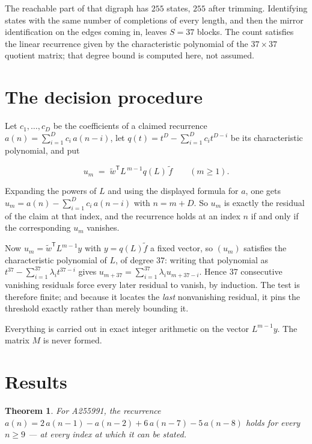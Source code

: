 \documentclass[11pt]{article}
\newtheorem{theorem}{Theorem}
\theoremstyle{definition}
\begin{document}
The reachable part of that digraph has $255$ states, $255$ after trimming. Identifying states with the same number of completions of every length, and then the mirror identification on the edges coming in, leaves $S = 37$ blocks. The count satisfies the linear recurrence given by the characteristic polynomial of the $37\times37$ quotient matrix; that degree bound is computed here, not assumed.

\section{The decision procedure}

Let $c_1,\dots,c_D$ be the coefficients of a claimed recurrence $a(n) = \sum_{i=1}^{D} c_i\,a(n-i)$, let $q(t) = t^{D} - \sum_{i=1}^{D} c_i t^{D-i}$ be its characteristic polynomial, and put

\[u_m \;=\; \tilde w^{\mathsf T} L^{\,m-1} q(L)\,\tilde f \qquad (m \ge 1).\]

Expanding the powers of $L$ and using the displayed formula for $a$, one gets $u_m = a(n) - \sum_{i=1}^{D} c_i\,a(n-i)$ with $n = m + D$. So $u_m$ is exactly the residual of the claim at that index, and the recurrence holds at an index $n$ if and only if the corresponding $u_m$ vanishes.

Now $u_m = \tilde w^{\mathsf T} L^{m-1} y$ with $y = q(L)\tilde f$ a fixed vector, so $(u_m)$ satisfies the characteristic polynomial of $L$, of degree $37$: writing that polynomial as $t^{37} - \sum_{i=1}^{37} \lambda_i t^{37-i}$ gives $u_{m+37} = \sum_{i=1}^{37} \lambda_i u_{m+37-i}$. Hence $37$ consecutive vanishing residuals force every later residual to vanish, by induction. The test is therefore finite; and because it locates the {\itshape last} nonvanishing residual, it pins the threshold exactly rather than merely bounding it.

Everything is carried out in exact integer arithmetic on the vector $L^{m-1}y$. The matrix $M$ is never formed.

\section{Results}

\begin{theorem} For A255991, the recurrence $a(n) = 2\,a(n-1) - a(n-2) + 6\,a(n-7) - 5\,a(n-8)$ holds for every $n \ge 9$ --- at every index at which it can be stated.\end{theorem}
\end{document}

